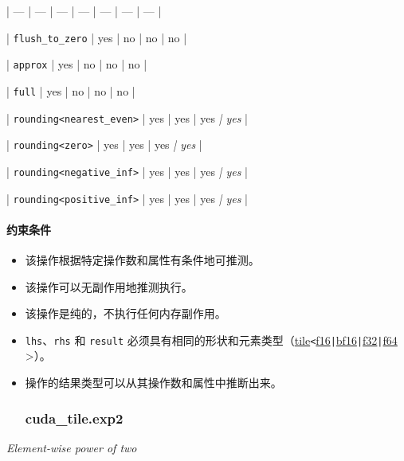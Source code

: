 \documentclass{article}
\begin{document}
| --- | --- | --- | --- | --- | --- | --- |


| \texttt{flush\_to\_zero} | yes | no | no | no |


| \texttt{approx} | yes | no | no | no |


| \texttt{full} | yes | no | no | no |


| \texttt{rounding<nearest\_even>} | yes | yes | yes\textit{ | yes} |


| \texttt{rounding<zero>} | yes | yes | yes\textit{ | yes} |


| \texttt{rounding<negative\_inf>} | yes | yes | yes\textit{ | yes} |


| \texttt{rounding<positive\_inf>} | yes | yes | yes\textit{ | yes} |






\paragraph{约束条件}


\begin{itemize}
\item 该操作根据特定操作数和属性有条件地可推测。
\item 该操作可以无副作用地推测执行。
\item 该操作是纯的，不执行任何内存副作用。
\item \texttt{lhs}、\texttt{rhs} 和 \texttt{result} 必须具有相同的形状和元素类型（\href{https://docs.nvidia.com/cuda/tile-ir/latest/sections/types.html#type-tile}{tile}\texttt{<}\href{https://docs.nvidia.com/cuda/tile-ir/latest/sections/types.html#subsection-element-types}{f16}\texttt{|}\href{https://docs.nvidia.com/cuda/tile-ir/latest/sections/types.html#subsection-element-types}{bf16}\texttt{|}\href{https://docs.nvidia.com/cuda/tile-ir/latest/sections/types.html#subsection-element-types}{f32}\texttt{|}\href{https://docs.nvidia.com/cuda/tile-ir/latest/sections/types.html#subsection-element-types}{f64} >）。
\item 操作的结果类型可以从其操作数和属性中推断出来。




\subsubsection{cuda\_tile.exp2}


\end{itemize}
\textit{Element-wise power of two}
\end{document}
